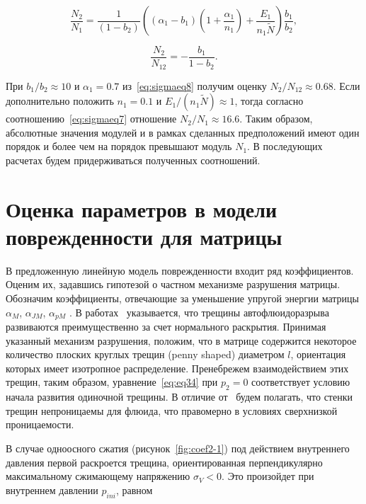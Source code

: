 \begin{equation}
  \label{eq:sigmaeq7}
  \frac{N_2}{N_1} = \frac{1}{(1-b_2)} \left( (\alpha_1 - b_1) \left( 1 + \frac{\alpha_1}{n_1} \right) + \frac{E_1}{n_1 \widetilde{N}} \right) \frac{b_1}{b_2},
\end{equation}

\begin{equation}
  \label{eq:sigmaeq8}
  \frac{N_2}{N_{12}} = - \frac{b_1}{1 - b_2}.
\end{equation}

При $b_1/b_2 \approx 10$ и $\alpha_1 = 0.7$ из~\eqref{eq:sigmaeq8} получим оценку $N_2/N_{12} \approx 0.68$. Если дополнительно положить $n_1 = 0.1$ и $E_1/(n_1 \widetilde{N}) \approx 1$, тогда согласно соотношению~\eqref{eq:sigmaeq7} отношение $N_2/N_1 \approx 16.6$. Таким образом, абсолютные значения модулей  и  в рамках сделанных предположений имеют один порядок и более чем на порядок превышают модуль $N_1$. В последующих расчетах будем придерживаться полученных соотношений.

\section{Оценка параметров в модели поврежденности для матрицы}\label{sec:ch2/sec02}

В предложенную линейную модель поврежденности входит ряд коэффициентов. Оценим их, задавшись гипотезой о частном механизме разрушения матрицы. Обозначим коэффициенты, отвечающие за уменьшение упругой энергии матрицы $\alpha_M$, $\alpha_{JM}$, $\alpha_{pM}$ . В работах~\autocite{engelder1990natural, luo2002natural} указывается, что трещины автофлюидоразрыва развиваются преимущественно за счет нормального раскрытия. Принимая указанный механизм разрушения, положим, что в матрице содержится некоторое количество плоских круглых трещин (penny shaped) диаметром $l$, ориентация которых имеет изотропное распределение. Пренебрежем взаимодействием этих трещин, таким образом, уравнение~\eqref{eq:eq34} при $p_2 = 0$ соответствует условию начала развития одиночной трещины. В отличие от~\autocite{engelder1990natural} будем полагать, что стенки трещин непроницаемы для флюида, что правомерно в условиях сверхнизкой проницаемости.

В случае одноосного сжатия (рисунок~\ref{fig:coef2-1}) под действием внутреннего давления первой раскроется трещина, ориентированная перпендикулярно максимальному сжимающему напряжению $\sigma_V < 0$. Это произойдет при внутреннем давлении $p_{ini}$, равном~\autocite{engelder1990natural}


